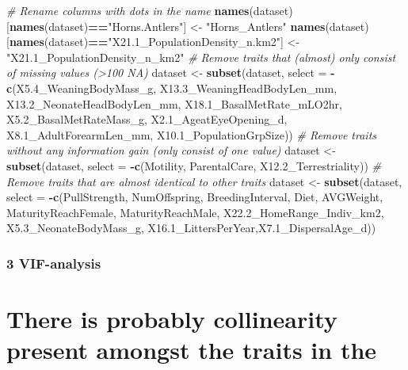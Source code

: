 \documentclass[
]{article}
\newenvironment{Shaded}{\begin{snugshade}}{\end{snugshade}}
\newcommand{\CommentTok}[1]{\textcolor[rgb]{0.56,0.35,0.01}{\textit{#1}}}
\newcommand{\DataTypeTok}[1]{\textcolor[rgb]{0.13,0.29,0.53}{#1}}
\newcommand{\FloatTok}[1]{\textcolor[rgb]{0.00,0.00,0.81}{#1}}
\newcommand{\KeywordTok}[1]{\textcolor[rgb]{0.13,0.29,0.53}{\textbf{#1}}}
\newcommand{\NormalTok}[1]{#1}
\newcommand{\OperatorTok}[1]{\textcolor[rgb]{0.81,0.36,0.00}{\textbf{#1}}}
\newcommand{\StringTok}[1]{\textcolor[rgb]{0.31,0.60,0.02}{#1}}
\begin{document}
\begin{Shaded}
\begin{Highlighting}[]
\CommentTok{# Rename columns with dots in the name}
\KeywordTok{names}\NormalTok{(dataset)[}\KeywordTok{names}\NormalTok{(dataset)}\OperatorTok{==}\StringTok{"Horns.Antlers"}\NormalTok{] <-}\StringTok{ "Horns_Antlers"}
\KeywordTok{names}\NormalTok{(dataset)[}\KeywordTok{names}\NormalTok{(dataset)}\OperatorTok{==}\StringTok{"X21.1_PopulationDensity_n.km2"}\NormalTok{] <-}\StringTok{ "X21.1_PopulationDensity_n_km2"}
\CommentTok{# Remove traits that (almost) only consist of missing values (>100 NA)}
\NormalTok{dataset <-}\StringTok{ }\KeywordTok{subset}\NormalTok{(dataset, }\DataTypeTok{select =} \OperatorTok{-}\KeywordTok{c}\NormalTok{(X5}\FloatTok{.4}\NormalTok{_WeaningBodyMass_g, X13}\FloatTok{.3}\NormalTok{_WeaningHeadBodyLen_mm, X13}\FloatTok{.2}\NormalTok{_NeonateHeadBodyLen_mm, X18}\FloatTok{.1}\NormalTok{_BasalMetRate_mLO2hr, X5}\FloatTok{.2}\NormalTok{_BasalMetRateMass_g, X2}\FloatTok{.1}\NormalTok{_AgeatEyeOpening_d, X8}\FloatTok{.1}\NormalTok{_AdultForearmLen_mm, X10}\FloatTok{.1}\NormalTok{_PopulationGrpSize))}
\CommentTok{# Remove traits without any information gain (only consist of one value)}
\NormalTok{dataset <-}\StringTok{ }\KeywordTok{subset}\NormalTok{(dataset, }\DataTypeTok{select =} \OperatorTok{-}\KeywordTok{c}\NormalTok{(Motility, ParentalCare, X12}\FloatTok{.2}\NormalTok{_Terrestriality))}
\CommentTok{# Remove traits that are almost identical to other traits}
\NormalTok{dataset <-}\StringTok{ }\KeywordTok{subset}\NormalTok{(dataset, }\DataTypeTok{select =} \OperatorTok{-}\KeywordTok{c}\NormalTok{(PullStrength, NumOffspring, BreedingInterval, }
\NormalTok{                                       Diet, AVGWeight, MaturityReachFemale, MaturityReachMale,}
\NormalTok{                                       X22}\FloatTok{.2}\NormalTok{_HomeRange_Indiv_km2, X5}\FloatTok{.3}\NormalTok{_NeonateBodyMass_g,}
\NormalTok{                                       X16}\FloatTok{.1}\NormalTok{_LittersPerYear,X7}\FloatTok{.1}\NormalTok{_DispersalAge_d))}
\end{Highlighting}
\end{Shaded}

\hypertarget{vif-analysis}{%
\subsubsection{3 VIF-analysis}\label{vif-analysis}}

\hypertarget{there-is-probably-collinearity-present-amongst-the-traits-in-the}{%
\section{There is probably collinearity present amongst the traits in
the}\label{there-is-probably-collinearity-present-amongst-the-traits-in-the}}
\end{document}
